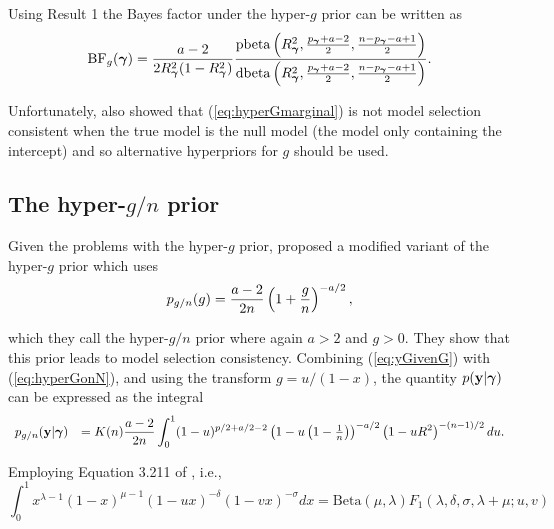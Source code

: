 \noindent Using Result 1 the Bayes factor under the hyper-$g$ prior can be written as
\begin{equation}\label{eq:hyperGmarginal2}
	\displaystyle \mbox{BF}_{g}({\boldsymbol \gamma}) 
	=  
	\frac{a - 2}{2 R_{\boldsymbol \gamma}^2(1 - R_{\boldsymbol \gamma}^2)} 
	\frac{\mbox{pbeta}\left(R_{\boldsymbol \gamma}^2,\tfrac{p_{\boldsymbol \gamma} + a - 2}{2},\tfrac{n-p_{\boldsymbol \gamma} - a+1}{2}\right)}{
		\mbox{dbeta}\left(R_{\boldsymbol \gamma}^2,\tfrac{p_{\boldsymbol \gamma} + a - 2}{2},\tfrac{n-p_{\boldsymbol \gamma} - a+1}{2}\right)}.
\end{equation}


\noindent 
Unfortunately, \cite{Liang2008} also showed that
(\ref{eq:hyperGmarginal}) is not model selection consistent when the
true model is the null model (the model only containing the intercept) and so alternative hyperpriors for $g$ should be used.




\subsection{The hyper-$g/n$ prior}

Given the problems with the hyper-$g$ prior, \cite{Liang2008} 
proposed a modified variant of the hyper-$g$ prior which uses
\begin{equation}\label{eq:hyperGonN}
	\displaystyle p_{g/n}(g) = \frac{a - 2}{2n}\left( 1 + \frac{g}{n} \right)^{-a/2},
\end{equation}

\noindent which they call the hyper-$g/n$ prior where again $a>2$ and $g>0$.
They show that this prior leads to model selection consistency.
Combining (\ref{eq:yGivenG}) with (\ref{eq:hyperGonN}), and using the transform
$g = u/(1 - x)$, the quantity $p({\bf y}|{\boldsymbol \gamma})$ 
can be expressed as the integral
\begin{equation}\label{eq:hyperGonNmarginalIntegral}
	\begin{array}{rl}
		p_{g/n}({\bf y}|{\boldsymbol \gamma}) 
		& \displaystyle = K(n) \frac{a - 2}{2n}  \int_0^1 
		(1 - u)^{p/2 + a/2 - 2  } \left(  1 - u \left(1  -  \tfrac{1}{n} \right) \right)^{-a/2} \left(  1 - u R^2\right)^{-(n-1)/2} du.
	\end{array} 
\end{equation}

\noindent  Employing 
Equation 3.211 of \cite{Gradshteyn2007}, i.e.,
$$
\int_0^1 x^{\lambda-1}(1 - x)^{\mu - 1}(1 - u x)^{-\delta}(1 - vx)^{-\sigma} dx = \mbox{Beta}(\mu,\lambda) F_1(\lambda,\delta,\sigma,\lambda+\mu;u,v) 
$$

